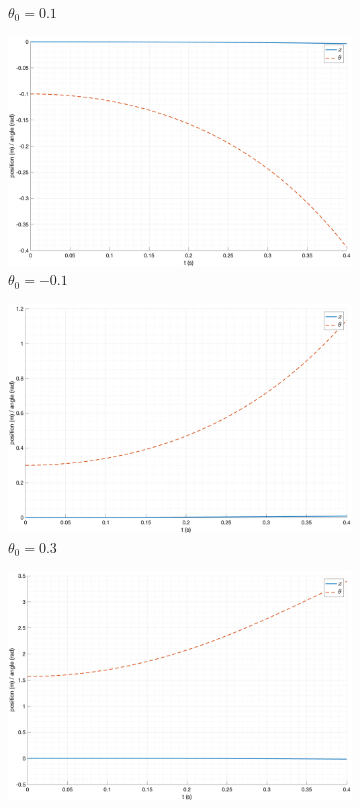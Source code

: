 \begin{figure}[ht!]
\begin{subfigure}[b]{0.45\textwidth}
        \caption{$\theta_0 = 0.1$}
    \end{subfigure}
    \begin{subfigure}[b]{0.45\textwidth}
        \includegraphics[width=\textwidth]{media/plots/free_motion/nonlin_3.png}
        \caption{$\theta_0 = -0.1$}
    \end{subfigure}
    \begin{subfigure}[b]{0.45\textwidth}
        \includegraphics[width=\textwidth]{media/plots/free_motion/nonlin_4.png}
        \caption{$\theta_0 = 0.3$}
    \end{subfigure}
    \begin{subfigure}[b]{0.45\textwidth}
        \includegraphics[width=\textwidth]{media/plots/free_motion/nonlin_5.png}

\end{subfigure}
\end{figure}
